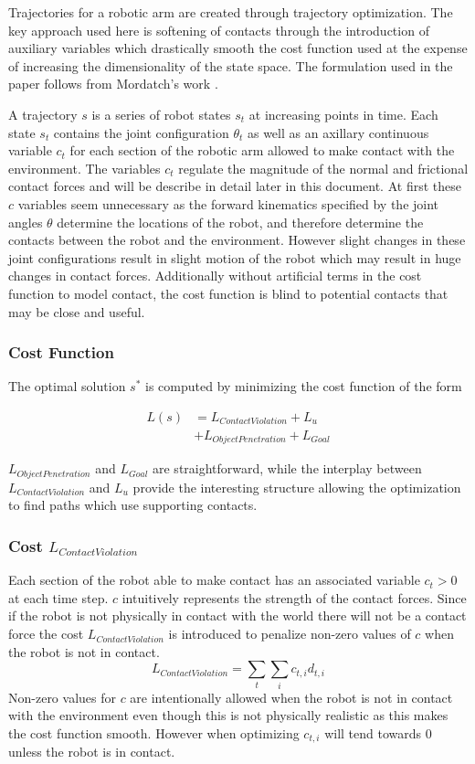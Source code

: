 \documentclass[../thesis.tex]{subfiles}
\begin{document}
Trajectories for a robotic arm are created through trajectory optimization. The key approach used here is softening of contacts through the introduction of auxiliary variables which drastically smooth the cost function used at the expense of increasing the dimensionality of the state space. The formulation used in the paper follows from Mordatch's work \cite{Mordatch2012}.

A trajectory $s$ is a series of robot states $s_t$ at increasing points in time. Each state $s_t$ contains the joint configuration $\theta_t$ as well as an axillary continuous variable $c_t$ for each section of the robotic arm allowed to make contact with the environment. The variables $c_t$ regulate the magnitude of the normal and frictional contact forces and will be describe in detail later in this document. At first these $c$ variables seem unnecessary as the forward kinematics specified by the joint angles $\theta$ determine the locations of the robot, and therefore determine the contacts between the robot and the environment. However slight changes in these joint configurations result in slight motion of the robot which may result in huge changes in contact forces. Additionally without artificial terms in the cost function to model contact, the cost function is blind to potential contacts that may be close and useful. 

\subsubsection{Cost Function}
The optimal solution $s^*$ is computed by minimizing the cost function of the form

\begin{align*}
L(s) &= L_{Contact Violation} + L_{u} \\
&+ L_{Object Penetration} + L_{Goal}   
\end{align*}
    
$L_{Object Penetration}$ and $L_{Goal}$ are straightforward, while the interplay between $L_{Contact Violation}$ and $L_u$ provide the interesting structure allowing the optimization to find paths which use supporting contacts.




\subsubsection{Cost $L_{Contact Violation}$}
Each section of the robot able to make contact has an associated variable $c_t > 0$ at each time step. $c$ intuitively represents the strength of the contact forces. Since if the robot is not physically in contact with the world there will not be a contact force the cost $L_{Contact Violation}$ is introduced to penalize non-zero values of $c$ when the robot is not in contact. 
$$L_{Contact Violation} = \sum_t{\sum_i{c_{t,i} d_{t,i}}}$$
Non-zero values for $c$ are intentionally allowed when the robot is not in contact with the environment even though this is not physically realistic as this makes the cost function smooth. However when optimizing $c_{t,i}$ will tend towards 0 unless the robot is in contact.
\end{document}
